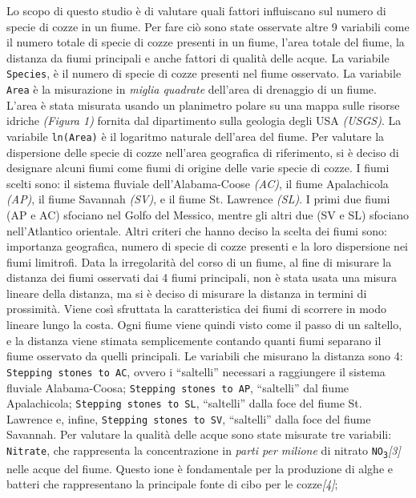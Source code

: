 \documentclass{article} %
\begin{document}
Lo scopo di questo studio è di valutare quali fattori influiscano sul numero di specie di cozze in un fiume. Per fare ciò sono state osservate altre 9 variabili come il numero totale di specie di cozze presenti in un fiume, l'area totale del fiume, la distanza da fiumi principali e anche fattori di qualità delle acque. 
La variabile \texttt{Species}, è il numero di specie di cozze presenti nel fiume osservato. 
La variabile \texttt{Area} è la misurazione in \textit{miglia quadrate} dell'area di drenaggio di un fiume. L'area è stata misurata usando un planimetro polare su una mappa sulle risorse idriche \textit{(Figura 1)} fornita dal dipartimento sulla geologia degli USA \textit{(USGS)}.  
La variabile \texttt{ln(Area)} è il logaritmo naturale dell'area del fiume.
Per valutare la dispersione delle specie di cozze nell'area geografica di riferimento, si è deciso di designare alcuni fiumi come fiumi di origine delle varie specie di cozze. 
I fiumi scelti sono: il sistema fluviale dell'Alabama-Coose \textit{(AC)}, il fiume Apalachicola \textit{(AP)}, il fiume Savannah \textit{(SV)}, e il fiume St. Lawrence \textit{(SL)}. I primi due fiumi (AP e AC) sfociano nel Golfo del Messico, mentre gli altri due (SV e SL) sfociano nell'Atlantico orientale. Altri criteri che hanno deciso la scelta dei fiumi sono: importanza geografica, numero di specie di cozze presenti e la loro dispersione nei fiumi limitrofi. Data la irregolarità del corso di un fiume, al fine di misurare la distanza dei fiumi osservati dai 4 fiumi principali, non è stata usata una misura lineare della distanza, ma si è deciso di misurare la distanza in termini di prossimità. Viene così sfruttata la caratteristica dei fiumi di scorrere in modo lineare lungo la costa. Ogni fiume viene quindi visto come il passo di un saltello, e la distanza viene stimata semplicemente contando quanti fiumi separano il fiume osservato da quelli principali. Le variabili che misurano la distanza sono 4: 
\texttt{Stepping stones to AC}, ovvero i “saltelli” necessari a raggiungere il sistema fluviale Alabama-Coosa; 
\texttt{Stepping stones to AP}, “saltelli” dal fiume Apalachicola; 
\texttt{Stepping stones to SL}, “saltelli” dalla foce del fiume St. Lawrence e, infine, 
\texttt{Stepping stones to SV}, “saltelli” dalla foce del fiume Savannah.
Per valutare la qualità delle acque sono state misurate tre variabili: 
\texttt{Nitrate}, che rappresenta la concentrazione in \textit{parti per milione} di nitrato \texttt{NO\textsubscript{3}}\textit{[3]} nelle acque del fiume. Questo ione è fondamentale per la produzione di alghe e batteri che rappresentano la principale fonte di cibo per le cozze\textit{[4]}; 
\end{document}
